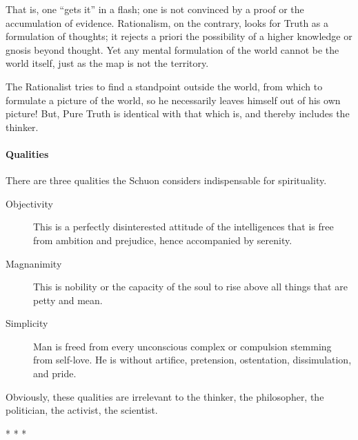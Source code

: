 That is, one ``gets it'' in a flash; one is not convinced by a proof or the accumulation of evidence. Rationalism, on the contrary, looks for Truth as a formulation of thoughts; it rejects a priori the possibility of a higher knowledge or gnosis beyond thought. Yet any mental formulation of the world cannot be the world itself, just as the map is not the territory.

The Rationalist tries to find a standpoint outside the world, from which to formulate a picture of the world, so he necessarily leaves himself out of his own picture! But, Pure Truth is identical with that which is, and thereby includes the thinker.

\paragraph{Qualities}


There are three qualities the Schuon considers indispensable for spirituality.

\begin{description}

\item[Objectivity]

This is a perfectly disinterested attitude of the intelligences that is free from ambition and prejudice, hence accompanied by serenity.
\item[Magnanimity]

This is nobility or the capacity of the soul to rise above all things that are petty and mean.
\item[Simplicity]

Man is freed from every unconscious complex or compulsion stemming from self-love. He is without artifice, pretension, ostentation, dissimulation, and pride.
\end{description}


Obviously, these qualities are irrelevant to the thinker, the philosopher, the politician, the activist, the scientist.


\begin{center}* * *\end{center}

